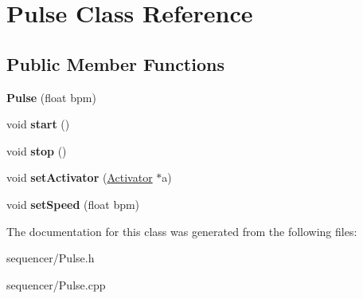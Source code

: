 \hypertarget{classPulse}{}\section{Pulse Class Reference}
\label{classPulse}
\subsection*{Public Member Functions}
\begin{DoxyCompactItemize}
\item 
{\bfseries Pulse} (float bpm)\hypertarget{classPulse_a9835b637db766732dd508c94fc30c501}{}\label{classPulse_a9835b637db766732dd508c94fc30c501}

\item 
void {\bfseries start} ()\hypertarget{classPulse_a164d81d4e1e798a5eec15b0b030b4047}{}\label{classPulse_a164d81d4e1e798a5eec15b0b030b4047}

\item 
void {\bfseries stop} ()\hypertarget{classPulse_a7c8121986bec5319bb097216fe5e93d0}{}\label{classPulse_a7c8121986bec5319bb097216fe5e93d0}

\item 
void {\bfseries set\+Activator} (\hyperlink{classActivator}{Activator} $\ast$a)\hypertarget{classPulse_a8283f4ab252e0c38b1e19a4dec522f23}{}\label{classPulse_a8283f4ab252e0c38b1e19a4dec522f23}

\item 
void {\bfseries set\+Speed} (float bpm)\hypertarget{classPulse_afc87b2e4120c47942cf03fc82aaf8002}{}\label{classPulse_afc87b2e4120c47942cf03fc82aaf8002}

\end{DoxyCompactItemize}


The documentation for this class was generated from the following files\+:\begin{DoxyCompactItemize}
\item 
sequencer/Pulse.\+h\item 
sequencer/Pulse.\+cpp\end{DoxyCompactItemize}
